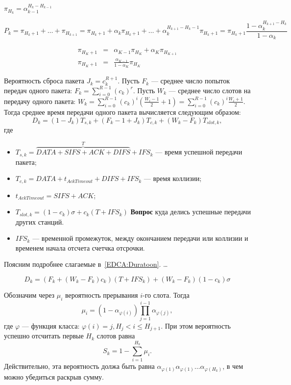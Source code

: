 $\pi_{H_k} = \alpha_{k-1}^{H_k-H_{k-1}}$

\begin{equation}
P_k = \pi_{H_k+1} + \dots + \pi_{H_{k+1}} = \pi_{H_k+1} + \alpha_k \pi_{H_k+1} + \dots + \alpha_k^{H_{k+1}-H_k-1}\pi_{H_k+1} = \pi_{H_k+1} \frac{1-\alpha_k^{H_{k+1}-H_k}}{1-\alpha_k}
\end{equation}

\begin{eqnarray}
\pi_{H_{K}+1} & = & \alpha_{K-1}\pi_{H_{K}} + \alpha_{K} \pi_{H_{K+1}} \\
\pi_{H_{K}+1} & = & \frac{\alpha_{K-1}}{1-\alpha_{K}}\pi_{H_K}
\end{eqnarray}

Вероятность сброса пакета $J_k = c_k^{R+1}$. 
Пусть $F_k$ --- среднее число попыток передач одного пакета: $F_k = \sum\limits_{i = 0}^{R-1} (c_k)^r$. Пусть $W_k$ --- среднее число слотов на передачу одного пакета: $W_k = \sum\limits_{i=0}^{R-1} (c_k)^i \left(\frac{W_{i}-1}{2} + 1 \right) = \sum\limits_{i=0}^{R-1} (c_k)^i \frac{W_{i}+1}{2}$. Тогда среднее время передачи одного пакета вычисляется следующим образом:
\begin{equation}
\label{EDCA:Duratoon}
D_k = (1-J_k)T_{s,k} + (F_{k}-1+J_k)T_{c,k} + (W_k-F_k)T_{slot,k},
\end{equation}
где 
\begin{itemize}
\item $T_{s,k} = \overbrace{DATA + SIFS + ACK + DIFS}^{T} + IFS_k$ --- время успешной передачи пакета;
\item $T_{c,k} = DATA + t_{AckTimeout} + DIFS + IFS_k$ --- время коллизии;
\item $t_{AckTimeout} = SIFS + ACK$;
\item $T_{slot,k} = (1-c_k)\sigma + c_k(T+IFS_k)$ \textbf{Вопрос} куда делись успешные передачи других станций.
\item $IFS_k$ --- временной промежуток, между окончанием передачи или коллизии и временем начала отсчета счетчка отсрочки.
\end{itemize}
Поясним подробнее слагаемые в~\eqref{EDCA:Duratoon}. \dots

\begin{equation}
D_k = (F_k + (W_k-F_k)c_k)(T+IFS_k) + (W_k - F_k)(1-c_k)\sigma
\end{equation}

Обозначим через $\mu_i$ вероятность прерывания $i$-го слота. Тогда
\begin{equation}
\mu_i = (1-\alpha_{\varphi(i)})\prod\limits_{j = 1} ^{i-1} \alpha_{\varphi(j)},
\end{equation}
где $\varphi$ --- функция класса: $\varphi(i) = j, H_j < i \leqslant H_{j+1}$. При этом вероятность успешно отсчитать первые $H_k$ слотов равна 
\begin{equation}
S_k = 1 - \sum\limits_{i=1}^{H_k} \mu_i.
\end{equation}
Действительно, эта вероятность должа быть равна $\alpha_{\varphi(1)}\alpha_{\varphi(1)}\dots\alpha_{\varphi(H_k)}$, в чем можно убедиться раскрыв сумму.

